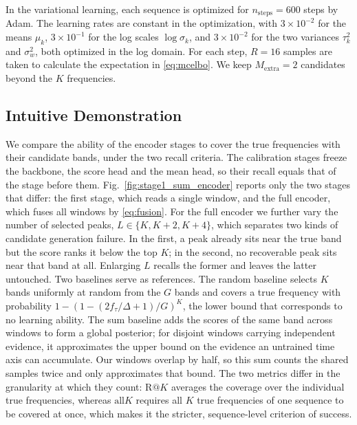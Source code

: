 \documentclass[journal,onecolumn]{IEEEtran}
\begin{document}
In the variational learning, each sequence is optimized for $n_{\mathrm{steps}}=600$ steps by Adam. The learning rates are constant in the optimization, with $3\times10^{-2}$ for the means $\mu_k$, $3\times10^{-1}$ for the log scales $\log\sigma_k$, and $3\times10^{-2}$ for the two variances $\tau_k^2$ and $\sigma_w^2$, both optimized in the log domain. For each step, $R=16$ samples are taken to calculate the expectation in \eqref{eq:mcelbo}. We keep $M_{\mathrm{extra}}=2$ candidates beyond the $K$ frequencies.

\subsection{Intuitive Demonstration}
\label{sec:exp_demo}

We compare the ability of the encoder stages to cover the true frequencies with their candidate bands, under the two recall criteria. The calibration stages freeze the backbone, the score head and the mean head, so their recall equals that of the stage before them. Fig.~\ref{fig:stage1_sum_encoder} reports only the two stages that differ: the first stage, which reads a single window, and the full encoder, which fuses all windows by \eqref{eq:fusion}. For the full encoder we further vary the number of selected peaks, $L\in\{K,K+2,K+4\}$, which separates two kinds of candidate generation failure. In the first, a peak already sits near the true band but the score ranks it below the top $K$; in the second, no recoverable peak sits near that band at all. Enlarging $L$ recalls the former and leaves the latter untouched. Two baselines serve as references. The random baseline selects $K$ bands uniformly at random from the $G$ bands and covers a true frequency with probability $1-(1-(2f_{\tau}/\Delta+1)/G)^{K}$, the lower bound that corresponds to no learning ability. The sum baseline adds the scores of the same band across windows to form a global posterior; for disjoint windows carrying independent evidence, it approximates the upper bound on the evidence an untrained time axis can accumulate. Our windows overlap by half, so this sum counts the shared samples twice and only approximates that bound. The two metrics differ in the granularity at which they count: $\mathrm{R}@K$ averages the coverage over the individual true frequencies, whereas $\mathrm{all}K$ requires all $K$ true frequencies of one sequence to be covered at once, which makes it the stricter, sequence-level criterion of success.
\end{document}
